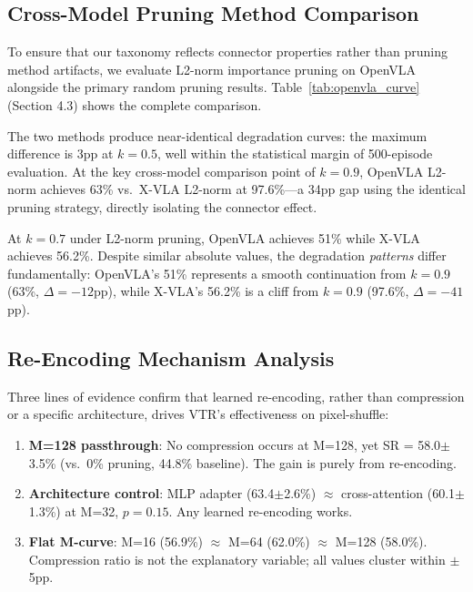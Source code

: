 \documentclass[letterpaper]{article}
\begin{document}
\subsection{Cross-Model Pruning Method Comparison}

To ensure that our taxonomy reflects connector properties rather than pruning method artifacts, we evaluate L2-norm importance pruning on OpenVLA alongside the primary random pruning results. Table~\ref{tab:openvla_curve} (Section 4.3) shows the complete comparison.

The two methods produce near-identical degradation curves: the maximum difference is 3pp at $k{=}0.5$, well within the statistical margin of 500-episode evaluation. At the key cross-model comparison point of $k{=}0.9$, OpenVLA L2-norm achieves 63\% vs.\ X-VLA L2-norm at 97.6\%---a 34pp gap using the identical pruning strategy, directly isolating the connector effect.

At $k{=}0.7$ under L2-norm pruning, OpenVLA achieves 51\% while X-VLA achieves 56.2\%. Despite similar absolute values, the degradation \emph{patterns} differ fundamentally: OpenVLA's 51\% represents a smooth continuation from $k{=}0.9$ (63\%, $\Delta = -12$pp), while X-VLA's 56.2\% is a cliff from $k{=}0.9$ (97.6\%, $\Delta = -41$pp).

\subsection{Re-Encoding Mechanism Analysis}

Three lines of evidence confirm that learned re-encoding, rather than compression or a specific architecture, drives VTR's effectiveness on pixel-shuffle:

\begin{enumerate}[leftmargin=*,nosep]
    \item \textbf{M=128 passthrough}: No compression occurs at M=128, yet SR = 58.0$\pm$3.5\% (vs.\ 0\% pruning, 44.8\% baseline). The gain is purely from re-encoding.
    \item \textbf{Architecture control}: MLP adapter (63.4$\pm$2.6\%) $\approx$ cross-attention (60.1$\pm$1.3\%) at M=32, $p = 0.15$. Any learned re-encoding works.
    \item \textbf{Flat M-curve}: M=16 (56.9\%) $\approx$ M=64 (62.0\%) $\approx$ M=128 (58.0\%). Compression ratio is not the explanatory variable; all values cluster within $\pm$5pp.
\end{enumerate}
\end{document}
